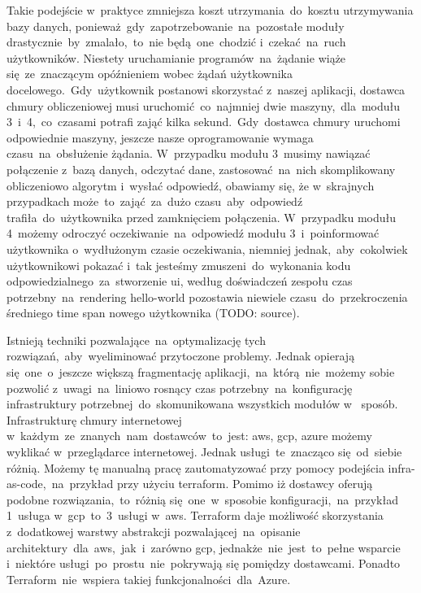 \indent Takie podejście w~praktyce zmniejsza koszt utrzymania~do~kosztu utrzymywania bazy danych, ponieważ~gdy~zapotrzebowanie~na~pozostałe moduły drastycznie~by~zmalało,~to~nie będą~one~chodzić i~czekać~na~ruch użytkowników.
Niestety uruchamianie programów~na~żądanie wiąże się~ze~znaczącym opóźnieniem wobec żądań użytkownika docelowego.~Gdy~użytkownik postanowi skorzystać z~naszej aplikacji, dostawca chmury obliczeniowej musi uruchomić~co~najmniej dwie maszyny,~dla~modułu 3~i~4,~co~czasami potrafi zająć kilka sekund.~Gdy~dostawca chmury uruchomi odpowiednie maszyny, jeszcze nasze oprogramowanie wymaga czasu~na~obsłużenie żądania.
W~przypadku modułu 3~musimy nawiązać połączenie z~bazą danych, odczytać dane, zastosować~na~nich skomplikowany obliczeniowo algorytm i~wysłać odpowiedź, obawiamy się, że w~skrajnych przypadkach może~to~zająć~za~dużo czasu~aby~odpowiedź trafiła~do~użytkownika przed zamknięciem połączenia.
W~przypadku modułu 4~możemy odroczyć oczekiwanie~na~odpowiedź modułu 3~i~poinformować użytkownika o~wydłużonym czasie oczekiwania, niemniej jednak,~aby~cokolwiek użytkownikowi pokazać i~tak jesteśmy zmuszeni~do~wykonania kodu odpowiedzialnego~za~stworzenie \gls{ui}, według doświadczeń zespołu czas potrzebny~na~\gls{rendering} \gls{hello-world} pozostawia niewiele czasu~do~przekroczenia średniego time span nowego użytkownika (TODO: source).

\indent Istnieją techniki pozwalające~na~optymalizację tych rozwiązań,~aby~wyeliminować przytoczone problemy.
Jednak opierają się~one~o~jeszcze większą fragmentację aplikacji,~na~którą~nie~możemy sobie pozwolić z~uwagi~na~liniowo rosnący czas potrzebny~na~konfigurację infrastruktury potrzebnej~do~skomunikowana wszystkich modułów w~ sposób.
Infrastrukturę chmury internetowej w~każdym~ze~znanych~nam~dostawców~to~jest: \acrshort{aws}, \acrshort{gcp}, \acrshort{azure} możemy wyklikać w~przeglądarce internetowej.
Jednak usługi~te~znacząco się~od~siebie różnią.
Możemy tę manualną pracę zautomatyzować przy pomocy podejścia \gls{infra-as-code},~na~przykład przy użyciu terraform.
Pomimo iż dostawcy oferują podobne rozwiązania,~to~różnią się~one~w~sposobie konfiguracji,~na~przykład 1~usługa w~\acrshort{gcp}~to~3~usługi w~\acrshort{aws}\@.
Terraform daje możliwość skorzystania z~dodatkowej warstwy abstrakcji pozwalającej~na~opisanie architektury~dla~\acrshort{aws},~jak~i~zarówno \acrshort{gcp}, jednakże~nie~jest~to~pełne wsparcie i~niektóre usługi~po~prostu~nie~pokrywają się pomiędzy dostawcami.
Ponadto Terraform~nie~wspiera takiej funkcjonalności~dla~Azure.

